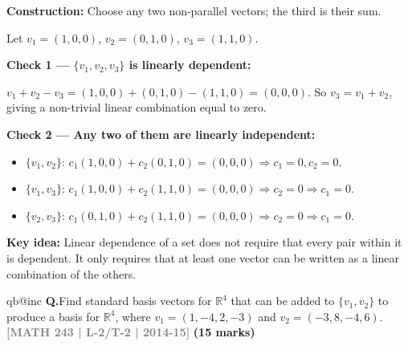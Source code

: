 \documentclass[12pt,a3paper]{article}
\makeatletter
\newcommand{\yr}[1]{\hfill\textcolor{gray}{\small\textbf{[#1]}}}
\newcommand{\mk}[1]{\textcolor{orange!70!black}{\small\textbf{(#1 marks)}}}
\newcounter{qnum}
\newcommand{\Q}[1]{%
  \csname qb@inc\endcsname
  \needspace{4\baselineskip}
  \refstepcounter{qnum}
  \vspace{6pt}
  \noindent\textbf{Q\theqnum.}\enspace #1\par
}
\makeatother
\begin{document}
\begin{tcolorbox}[enhanced,breakable,colback=cC!4,colframe=cC,
  boxrule=0.8pt,arc=5pt,
  title={\textbf{Answer}},
  fonttitle=\bfseries\color{white},colbacktitle=cC]

\textbf{Construction:} Choose any two non-parallel vectors; the third is their sum.

Let $v_1=(1,0,0)$, $v_2=(0,1,0)$, $v_3=(1,1,0)$.

\medskip
\textbf{Check 1 --- $\{v_1,v_2,v_3\}$ is linearly dependent:}

$v_1+v_2-v_3=(1,0,0)+(0,1,0)-(1,1,0)=(0,0,0)$. So $v_3=v_1+v_2$, giving a non-trivial linear combination equal to zero. \checkmark

\medskip
\textbf{Check 2 --- Any two of them are linearly independent:}

\begin{itemize}[itemsep=2pt]
  \item $\{v_1,v_2\}$: $c_1(1,0,0)+c_2(0,1,0)=(0,0,0)\Rightarrow c_1=0,c_2=0$. \checkmark
  \item $\{v_1,v_3\}$: $c_1(1,0,0)+c_2(1,1,0)=(0,0,0)\Rightarrow c_2=0\Rightarrow c_1=0$. \checkmark
  \item $\{v_2,v_3\}$: $c_1(0,1,0)+c_2(1,1,0)=(0,0,0)\Rightarrow c_2=0\Rightarrow c_1=0$. \checkmark
\end{itemize}

\textbf{Key idea:} Linear dependence of a set does not require that every pair within it is dependent. It only requires that at least one vector can be written as a linear combination of the others.
\end{tcolorbox}

\Q{Find standard basis vectors for $\mathbb{R}^4$ that can be added to $\{v_1, v_2\}$ to produce a basis for $\mathbb{R}^4$, where $v_1 = (1,-4,2,-3)$ and $v_2 = (-3,8,-4,6)$.
\yr{MATH 243 | L-2/T-2 | 2014-15} \mk{15}}
\end{document}
